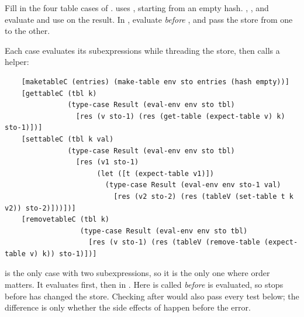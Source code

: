 \begin{exercise}
Fill in the four table cases of .  uses , starting from an empty hash. , , and  evaluate  and use  on the result. In , evaluate  \emph{before} , and pass the store from one to the other.
\end{exercise}
\begin{solution}
Each case evaluates its subexpressions while threading the store, then calls a helper:
\begin{lstlisting}
    [maketableC (entries) (make-table env sto entries (hash empty))]
    [gettableC (tbl k)
               (type-case Result (eval-env env sto tbl)
                 [res (v sto-1) (res (get-table (expect-table v) k) sto-1)])]
    [settableC (tbl k val)
               (type-case Result (eval-env env sto tbl)
                 [res (v1 sto-1)
                      (let ([t (expect-table v1)])
                        (type-case Result (eval-env env sto-1 val)
                          [res (v2 sto-2) (res (tableV (set-table t k v2)) sto-2)]))])]
    [removetableC (tbl k)
                  (type-case Result (eval-env env sto tbl)
                    [res (v sto-1) (res (tableV (remove-table (expect-table v) k)) sto-1)])]
\end{lstlisting}
 is the only case with two subexpressions, so it is the only one where order matters. It evaluates  first, then  in . Here  is called \emph{before}  is evaluated, so  stops before  has changed the store. Checking after  would also pass every test below; the difference is only whether the side effects of  happen before the error.
\end{solution}

